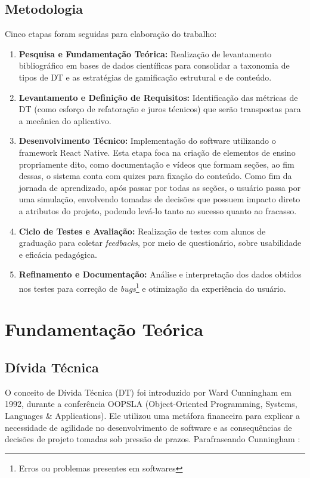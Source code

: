 \documentclass[12pt,openright,oneside,a4paper,brazil]{abntex2}
\begin{document}
\section{Metodologia}
Cinco etapas foram seguidas para elaboração do trabalho:

\begin{enumerate}
    \item \textbf{Pesquisa e Fundamentação Teórica:} Realização de levantamento bibliográfico em bases de dados científicas para consolidar a taxonomia de tipos de DT e as estratégias de gamificação estrutural e de conteúdo.
    \item \textbf{Levantamento e Definição de Requisitos:} Identificação das métricas de DT (como esforço de refatoração e juros técnicos) que serão transpostas para a mecânica do aplicativo.
    \item \textbf{Desenvolvimento Técnico:} Implementação do software utilizando o framework React Native. Esta etapa foca na criação de elementos de ensino propriamente dito, como documentação e vídeos que formam seções, ao fim dessas, o sistema conta com quizes para fixação do conteúdo. Como fim da jornada de aprendizado, após passar por todas as seções, o usuário passa por uma simulação, envolvendo tomadas de decisões que possuem impacto direto a atributos do projeto, podendo levá-lo tanto ao sucesso quanto ao fracasso.
    \item \textbf{Ciclo de Testes e Avaliação:} Realização de testes com alunos de graduação para coletar \textit{feedbacks}, por meio de questionário, sobre usabilidade e eficácia pedagógica.
    \item \textbf{Refinamento e Documentação:} Análise e interpretação dos dados obtidos nos testes para correção de \textit{bugs}\footnote{Erros ou problemas presentes em softwares} e otimização da experiência do usuário.
\end{enumerate}

\chapter{Fundamentação Teórica}
\section{Dívida Técnica}
O conceito de Dívida Técnica (DT) foi introduzido por Ward Cunningham em 1992, durante a conferência OOPSLA (Object-Oriented Programming, Systems, Languages \& Applications). Ele utilizou uma metáfora financeira para explicar a necessidade de agilidade no desenvolvimento de software e as consequências de decisões de projeto tomadas sob pressão de prazos. Parafraseando Cunningham \cite{cunningham1992}:
\end{document}
